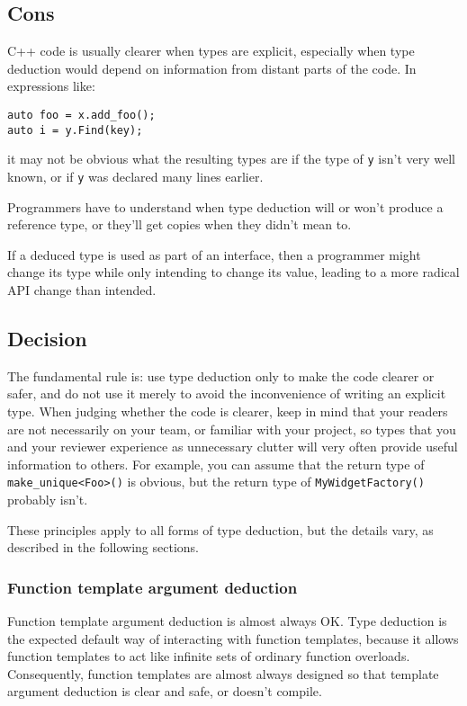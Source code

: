 \subsection{Cons}
C++ code is usually clearer when types are explicit, especially when type deduction would depend on information from distant parts of the code. In expressions like:
\begin{verbatim}
auto foo = x.add_foo();
auto i = y.Find(key);
\end{verbatim}
it may not be obvious what the resulting types are if the type of \texttt{y} isn't very well known, or if \texttt{y} was declared many lines earlier.

Programmers have to understand when type deduction will or won't produce a reference type, or they'll get copies when they didn't mean to.

If a deduced type is used as part of an interface, then a programmer might change its type while only intending to change its value, leading to a more radical API change than intended.


\subsection{Decision}
The fundamental rule is: use type deduction only to make the code clearer or safer, and do not use it merely to avoid the inconvenience of writing an explicit type. When judging whether the code is clearer, keep in mind that your readers are not necessarily on your team, or familiar with your project, so types that you and your reviewer experience as unnecessary clutter will very often provide useful information to others. For example, you can assume that the return type of \texttt{make_unique<Foo>()} is obvious, but the return type of \texttt{MyWidgetFactory()} probably isn't.

These principles apply to all forms of type deduction, but the details vary, as described in the following sections.


\subsubsection{Function template argument deduction}
Function template argument deduction is almost always OK. Type deduction is the expected default way of interacting with function templates, because it allows function templates to act like infinite sets of ordinary function overloads. Consequently, function templates are almost always designed so that template argument deduction is clear and safe, or doesn't compile.
